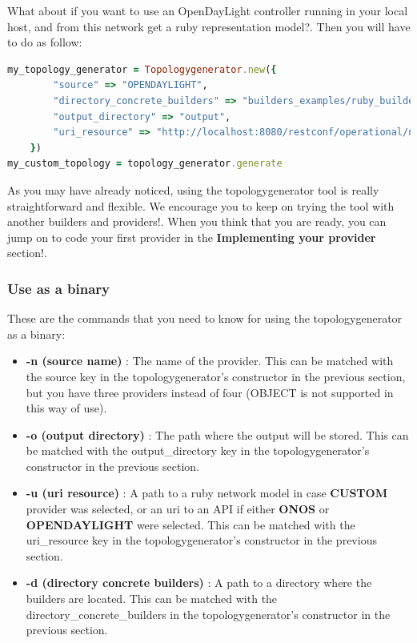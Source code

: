 What about if you want to use an OpenDayLight controller running in your local host, and from this network get a ruby representation model?. Then you will have to do as follow:

\begin{lstlisting}[language=Ruby,breaklines=true]
my_topology_generator = Topologygenerator.new({
        "source" => "OPENDAYLIGHT",
        "directory_concrete_builders" => "builders_examples/ruby_builders",
        "output_directory" => "output",
        "uri_resource" => "http://localhost:8080/restconf/operational/network-topology:network-topology/topology/flow:1/" 
    }) 
my_custom_topology = topology_generator.generate
\end{lstlisting}

As you may have already noticed, using the topologygenerator tool is really straightforward and flexible. We encourage you to keep on trying the tool with another builders and providers!. When you think that you are ready, you can jump on to code your first provider in the \textbf{Implementing your provider} section!.

\subsubsection{Use as a binary}

These are the commands that you need to know for using the topologygenerator as a binary:

\begin{itemize}
\item \textbf{-n (source name)} : The name of the provider. This can be matched with the source key in the topologygenerator's constructor in the previous section, but you have three providers instead of four (OBJECT is not supported in this way of use).
\item \textbf{-o (output directory)} : The path where the output will be stored. This can be matched with the output\_directory key in the topologygenerator's constructor in the previous section.
\item \textbf{-u (uri resource)} : A path to a ruby network model in case \textbf{CUSTOM} provider was selected, or an uri to an API if either \textbf{ONOS} or \textbf{OPENDAYLIGHT} were selected. This can be matched with the uri\_resource key in the topologygenerator's constructor in the previous section.
\item \textbf{-d (directory concrete builders)} : A path to a directory where the builders are located. This can be matched with the directory\_concrete\_builders in the topologygenerator's constructor in the previous section.
\end{itemize}

